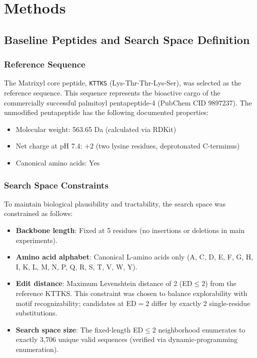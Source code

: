 \documentclass[11pt,letterpaper]{article}
\begin{document}
\section{Methods}

\subsection{Baseline Peptides and Search Space Definition}

\subsubsection{Reference Sequence}

The Matrixyl core peptide, \texttt{KTTKS} (Lys-Thr-Thr-Lys-Ser), was selected as the reference sequence. This sequence represents the bioactive cargo of the commercially successful palmitoyl pentapeptide-4 (PubChem CID 9897237). The unmodified pentapeptide has the following documented properties:
\begin{itemize}
  \item Molecular weight: 563.65 Da (calculated via RDKit)
  \item Net charge at pH 7.4: $+2$ (two lysine residues, deprotonated C-terminus)
  \item Canonical amino acids: Yes
\end{itemize}

\subsubsection{Search Space Constraints}

To maintain biological plausibility and tractability, the search space was constrained as follows:
\begin{itemize}
  \item \textbf{Backbone length}: Fixed at 5 residues (no insertions or deletions in main experiments).
  \item \textbf{Amino acid alphabet}: Canonical L-amino acids only (A, C, D, E, F, G, H, I, K, L, M, N, P, Q, R, S, T, V, W, Y).
  \item \textbf{Edit distance}: Maximum Levenshtein distance of 2 (ED$\leq 2$) from the reference KTTKS. This constraint was chosen to balance explorability with motif recognizability; candidates at ED$=2$ differ by exactly 2 single-residue substitutions.
  \item \textbf{Search space size}: The fixed-length ED$\leq 2$ neighborhood enumerates to exactly 3,706 unique valid sequences (verified via dynamic-programming enumeration).
\end{itemize}
\end{document}
